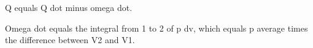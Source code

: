 Q equals Q dot minus omega dot.

Omega dot equals the integral from 1 to 2 of p dv, which equals p average times the difference between V2 and V1.